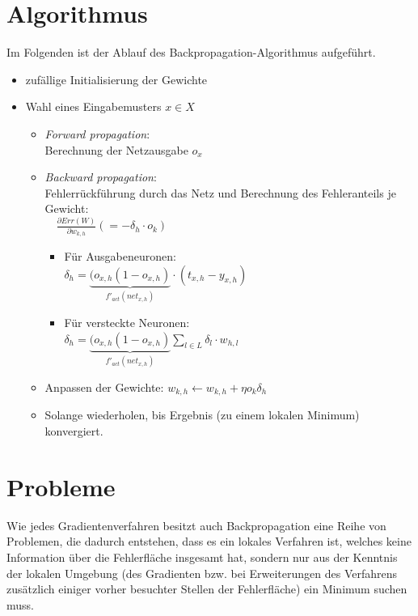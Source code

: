 \section*{Algorithmus}
Im Folgenden ist der Ablauf des Backpropagation-Algorithmus aufgeführt.

\begin{itemize}
	\item zufällige Initialisierung der Gewichte
	\item Wahl eines Eingabemusters $x \in X$

	\begin{itemize}
		\item \emph{Forward propagation}: \\
			Berechnung der Netzausgabe $o_x$
		\item \emph{Backward propagation}: \\
			Fehlerrückführung durch das Netz und Berechnung des Fehleranteils je Gewicht: \\
			$\quad \frac{\partial Err(W)}{\partial w_{k,h}}
				(= - \delta_h \cdot o_k) $

		\begin{itemize}
			\item Für Ausgabeneuronen: \\
				$\delta_h = 
				\underbrace{(o_{x,h}(1-o_{x,h})}_{f'_{act}(net_{x,h})} 
				\cdot (t_{x,h}-y_{x,h})$ 
			\item Für versteckte Neuronen: \\
				$\delta_h = 
				\underbrace{(o_{x,h}(1-o_{x,h})}_{f'_{act}(net_{x,h})} 
				\sum_{l \in L} \delta_l \cdot w_{h,l}$ 
		\end{itemize}

		\item Anpassen der Gewichte: $w_{k,h} \leftarrow w_{k,h} + \eta o_k \delta_h$ 
		\item Solange wiederholen, bis Ergebnis (zu einem lokalen Minimum) konvergiert.
	\end{itemize}

\end{itemize}


\section*{Probleme}
Wie jedes Gradientenverfahren besitzt auch Backpropagation eine Reihe von Problemen, die dadurch entstehen, dass es ein lokales Verfahren ist, welches keine Information über die Fehlerfläche insgesamt hat, sondern nur aus der Kenntnis der lokalen Umgebung (des Gradienten bzw. bei Erweiterungen des Verfahrens zusätzlich einiger vorher besuchter Stellen der Fehlerfläche) ein Minimum suchen muss.


